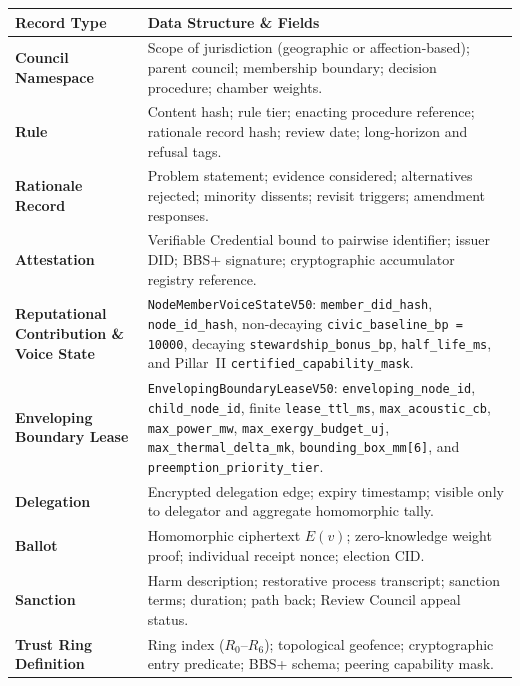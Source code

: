 \begin{table}[htbp]
\centering
\small
\setlength{\tabcolsep}{3pt}
\begin{tabular}{|p{}|p{}|}
\hline
\textbf{Record Type} & \textbf{Data Structure \& Fields} \\
\hline
\textbf{Council Namespace} & Scope of jurisdiction (geographic or affection-based); parent council; membership boundary; decision procedure; chamber weights. \\
\hline
\textbf{Rule} & Content hash; rule tier; enacting procedure reference; rationale record hash; review date; long-horizon and refusal tags. \\
\hline
\textbf{Rationale Record} & Problem statement; evidence considered; alternatives rejected; minority dissents; revisit triggers; amendment responses. \\
\hline
\textbf{Attestation} & Verifiable Credential bound to pairwise identifier; issuer DID; BBS+ signature; cryptographic accumulator registry reference. \\
\hline
\textbf{Reputational Contribution \& Voice State} & \texttt{NodeMemberVoiceStateV50}: \texttt{member\_did\_hash}, \texttt{node\_id\_hash}, non-decaying \texttt{civic\_baseline\_bp = 10000}, decaying \texttt{stewardship\_bonus\_bp}, \texttt{half\_life\_ms}, and Pillar~II \texttt{certified\_capability\_mask}. \\
\hline
\textbf{Enveloping Boundary Lease} & \texttt{EnvelopingBoundaryLeaseV50}: \texttt{enveloping\_node\_id}, \texttt{child\_node\_id}, finite \texttt{lease\_ttl\_ms}, \texttt{max\_acoustic\_cb}, \texttt{max\_power\_mw}, \texttt{max\_exergy\_budget\_uj}, \texttt{max\_thermal\_delta\_mk}, \texttt{bounding\_box\_mm[6]}, and \texttt{preemption\_priority\_tier}. \\
\hline
\textbf{Delegation} & Encrypted delegation edge; expiry timestamp; visible only to delegator and aggregate homomorphic tally. \\
\hline
\textbf{Ballot} & Homomorphic ciphertext $E(v)$; zero-knowledge weight proof; individual receipt nonce; election CID. \\
\hline
\textbf{Sanction} & Harm description; restorative process transcript; sanction terms; duration; path back; Review Council appeal status. \\
\hline
\textbf{Trust Ring Definition} & Ring index ($R_0$--$R_6$); topological geofence; cryptographic entry predicate; BBS+ schema; peering capability mask. \\
\hline

\end{tabular}
\end{table}
